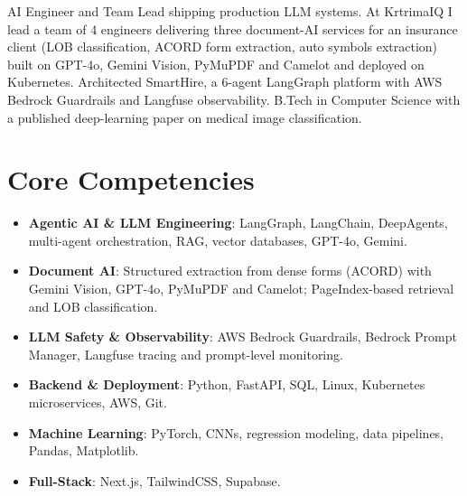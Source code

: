 \documentclass[11pt,a4paper,sans]{moderncv}
\begin{document}
\makecvtitle


\vspace{6pt}
\small{AI Engineer and Team Lead shipping production LLM systems. At KrtrimaIQ I lead a team of 4 engineers delivering three document-AI services for an insurance client (LOB classification, ACORD form extraction, auto symbols extraction) built on GPT-4o, Gemini Vision, PyMuPDF and Camelot and deployed on Kubernetes. Architected SmartHire, a 6-agent LangGraph platform with AWS Bedrock Guardrails and Langfuse observability. B.Tech in Computer Science with a published deep-learning paper on medical image classification.}


\section{Core Competencies}
\vspace{1pt}
\begin{itemize}

\item \textbf{Agentic AI \& LLM Engineering}: LangGraph, LangChain, DeepAgents, multi-agent orchestration, RAG, vector databases, GPT-4o, Gemini.

\item \textbf{Document AI}: Structured extraction from dense forms (ACORD) with Gemini Vision, GPT-4o, PyMuPDF and Camelot; PageIndex-based retrieval and LOB classification.

\item \textbf{LLM Safety \& Observability}: AWS Bedrock Guardrails, Bedrock Prompt Manager, Langfuse tracing and prompt-level monitoring.

\item \textbf{Backend \& Deployment}: Python, FastAPI, SQL, Linux, Kubernetes microservices, AWS, Git.

\item \textbf{Machine Learning}: PyTorch, CNNs, regression modeling, data pipelines, Pandas, Matplotlib.

\item \textbf{Full-Stack}: Next.js, TailwindCSS, Supabase.

\end{itemize}
\end{document}
